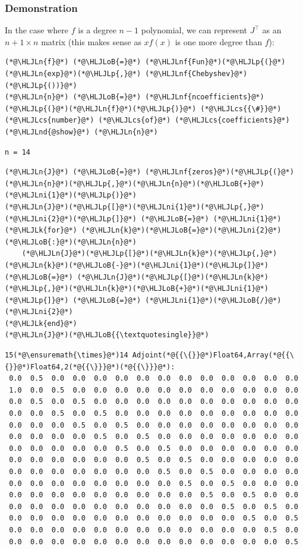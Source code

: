 \documentclass[12pt,a4paper]{article}
\newcommand{\HLJLk}[1]{\textcolor[RGB]{148,91,176}{\textbf{#1}}}
\newcommand{\HLJLn}[1]{#1}
\newcommand{\HLJLnd}[1]{\textcolor[RGB]{214,102,97}{#1}}
\newcommand{\HLJLnf}[1]{\textcolor[RGB]{66,102,213}{#1}}
\newcommand{\HLJLni}[1]{\textcolor[RGB]{59,151,46}{#1}}
\newcommand{\HLJLoB}[1]{\textcolor[RGB]{102,102,102}{\textbf{#1}}}
\newcommand{\HLJLp}[1]{#1}
\newcommand{\HLJLcs}[1]{\textcolor[RGB]{153,153,119}{\textit{#1}}}
\begin{document}
\subsubsection{Demonstration}
In the case where $f$ is a degree $n-1$  polynomial, we can represent $J^\top$ as an $n+1 \times n$ matrix (this makes sense as $x f(x)$ is one more degree than $f$):


\begin{lstlisting}
(*@\HLJLn{f}@*) (*@\HLJLoB{=}@*) (*@\HLJLnf{Fun}@*)(*@\HLJLp{(}@*)(*@\HLJLn{exp}@*)(*@\HLJLp{,}@*) (*@\HLJLnf{Chebyshev}@*)(*@\HLJLp{())}@*)
(*@\HLJLn{n}@*) (*@\HLJLoB{=}@*) (*@\HLJLnf{ncoefficients}@*)(*@\HLJLp{(}@*)(*@\HLJLn{f}@*)(*@\HLJLp{)}@*) (*@\HLJLcs{{\#}}@*) (*@\HLJLcs{number}@*) (*@\HLJLcs{of}@*) (*@\HLJLcs{coefficients}@*)
(*@\HLJLnd{@show}@*) (*@\HLJLn{n}@*)
\end{lstlisting}

\begin{lstlisting}
n = 14
\end{lstlisting}


\begin{lstlisting}
(*@\HLJLn{J}@*) (*@\HLJLoB{=}@*) (*@\HLJLnf{zeros}@*)(*@\HLJLp{(}@*)(*@\HLJLn{n}@*)(*@\HLJLp{,}@*)(*@\HLJLn{n}@*)(*@\HLJLoB{+}@*)(*@\HLJLni{1}@*)(*@\HLJLp{)}@*)
(*@\HLJLn{J}@*)(*@\HLJLp{[}@*)(*@\HLJLni{1}@*)(*@\HLJLp{,}@*)(*@\HLJLni{2}@*)(*@\HLJLp{]}@*) (*@\HLJLoB{=}@*) (*@\HLJLni{1}@*)
(*@\HLJLk{for}@*) (*@\HLJLn{k}@*)(*@\HLJLoB{=}@*)(*@\HLJLni{2}@*)(*@\HLJLoB{:}@*)(*@\HLJLn{n}@*)
    (*@\HLJLn{J}@*)(*@\HLJLp{[}@*)(*@\HLJLn{k}@*)(*@\HLJLp{,}@*)(*@\HLJLn{k}@*)(*@\HLJLoB{-}@*)(*@\HLJLni{1}@*)(*@\HLJLp{]}@*) (*@\HLJLoB{=}@*) (*@\HLJLn{J}@*)(*@\HLJLp{[}@*)(*@\HLJLn{k}@*)(*@\HLJLp{,}@*)(*@\HLJLn{k}@*)(*@\HLJLoB{+}@*)(*@\HLJLni{1}@*)(*@\HLJLp{]}@*) (*@\HLJLoB{=}@*) (*@\HLJLni{1}@*)(*@\HLJLoB{/}@*)(*@\HLJLni{2}@*)
(*@\HLJLk{end}@*)
(*@\HLJLn{J}@*)(*@\HLJLoB{{\textquotesingle}}@*)
\end{lstlisting}

\begin{lstlisting}
15(*@\ensuremath{\times}@*)14 Adjoint(*@{{\{}}@*)Float64,Array(*@{{\{}}@*)Float64,2(*@{{\}}}@*)(*@{{\}}}@*):
 0.0  0.5  0.0  0.0  0.0  0.0  0.0  0.0  0.0  0.0  0.0  0.0  0.0  0.0
 1.0  0.0  0.5  0.0  0.0  0.0  0.0  0.0  0.0  0.0  0.0  0.0  0.0  0.0
 0.0  0.5  0.0  0.5  0.0  0.0  0.0  0.0  0.0  0.0  0.0  0.0  0.0  0.0
 0.0  0.0  0.5  0.0  0.5  0.0  0.0  0.0  0.0  0.0  0.0  0.0  0.0  0.0
 0.0  0.0  0.0  0.5  0.0  0.5  0.0  0.0  0.0  0.0  0.0  0.0  0.0  0.0
 0.0  0.0  0.0  0.0  0.5  0.0  0.5  0.0  0.0  0.0  0.0  0.0  0.0  0.0
 0.0  0.0  0.0  0.0  0.0  0.5  0.0  0.5  0.0  0.0  0.0  0.0  0.0  0.0
 0.0  0.0  0.0  0.0  0.0  0.0  0.5  0.0  0.5  0.0  0.0  0.0  0.0  0.0
 0.0  0.0  0.0  0.0  0.0  0.0  0.0  0.5  0.0  0.5  0.0  0.0  0.0  0.0
 0.0  0.0  0.0  0.0  0.0  0.0  0.0  0.0  0.5  0.0  0.5  0.0  0.0  0.0
 0.0  0.0  0.0  0.0  0.0  0.0  0.0  0.0  0.0  0.5  0.0  0.5  0.0  0.0
 0.0  0.0  0.0  0.0  0.0  0.0  0.0  0.0  0.0  0.0  0.5  0.0  0.5  0.0
 0.0  0.0  0.0  0.0  0.0  0.0  0.0  0.0  0.0  0.0  0.0  0.5  0.0  0.5
 0.0  0.0  0.0  0.0  0.0  0.0  0.0  0.0  0.0  0.0  0.0  0.0  0.5  0.0
 0.0  0.0  0.0  0.0  0.0  0.0  0.0  0.0  0.0  0.0  0.0  0.0  0.0  0.5
\end{lstlisting}
\end{document}
